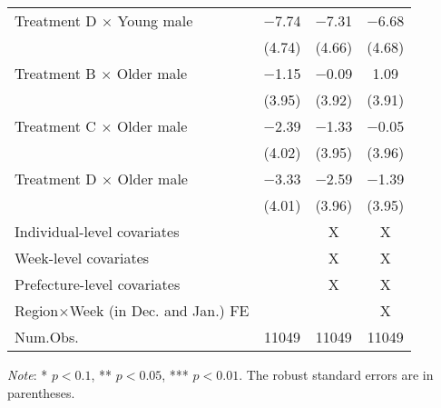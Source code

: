 \documentclass[12pt, a4paper]{article}
\begin{document}
\begin{table}
\begin{threeparttable}
\begin{tabular}[t]{lccc}
Treatment D $\times$ Young male & \num{-7.74} & \num{-7.31} & \num{-6.68}\\
 & (\num{4.74}) & (\num{4.66}) & (\num{4.68})\\
Treatment B $\times$ Older male & \num{-1.15} & \num{-0.09} & \num{1.09}\\
 & (\num{3.95}) & (\num{3.92}) & (\num{3.91})\\
Treatment C $\times$ Older male & \num{-2.39} & \num{-1.33} & \num{-0.05}\\
 & (\num{4.02}) & (\num{3.95}) & (\num{3.96})\\
Treatment D $\times$ Older male & \num{-3.33} & \num{-2.59} & \num{-1.39}\\
 & (\num{4.01}) & (\num{3.96}) & (\num{3.95})\\
\midrule
Individual-level covariates &  & X & X\\
Week-level covariates &  & X & X\\
Prefecture-level covariates &  & X & X\\
Region$\times$Week (in Dec. and Jan.) FE &  &  & X\\
Num.Obs. & \num{11049} & \num{11049} & \num{11049}\\
\bottomrule
\end{tabular}
\begin{tablenotes}
\item \emph{Note}: * $p < 0.1$, ** $p < 0.05$, *** $p < 0.01$. The robust standard errors are in parentheses. 
\end{tablenotes}
\end{threeparttable}
\end{table}
\end{document}

